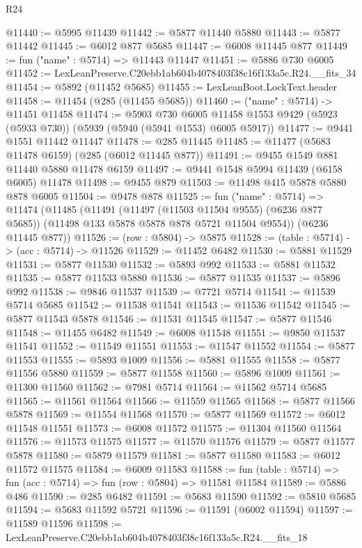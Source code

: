 \begin{lexlean}{R24}
\begin{coremodule}
@11440 := @5995 @11439
@11442 := @5877 @11440 @5880
@11443 := @5877 @11442
@11445 := @6012 @877 @5685
@11447 := @6008 @11445 @877
@11449 := fun ("name" : @5714) => @11443 @11447
@11451 := @5886 @730 @6005
@11452 := LexLeanPreserve.C20ebb1ab604b4078403f38c16f133a5c.R24.__fits_34
@11454 := @5892 (@11452 @5685)
@11455 := LexLeanBoot.LockText.header
@11458 := @11454 (@285 (@11455 @5685))
@11460 := ("name" : @5714) -> @11451 @11458
@11474 := @5903
    @730
    @6005
    @11458
    @1553
    @9429
    (@5923 (@5933 @730))
    (@5939 (@5940 (@5941 @1553) @6005 @5917))
@11477 := @9441 @1551 @11442 @11447
@11478 := @285 @11445
@11485 := @11477 (@5683 @11478 @6159) (@285 (@6012 @11445 @877))
@11491 := @9455 @1549 @881 @11440 @5880 @11478 @6159
@11497 := @9441 @1548 @5994 @11439 (@6158 @6005) @11478
@11498 := @9455 @879
@11503 := @11498 @415 @5878 @5880 @878 @6005
@11504 := @9478 @878
@11525 := fun ("name" : @5714) =>
  @11474
    (@11485
      (@11491
        (@11497 (@11503 @11504 @9555) (@6236 @877 @5685))
        (@11498 @133 @5878 @5878 @878 @5721 @11504 @9554))
      (@6236 @11445 @877))
@11526 := (row : @5804) -> @5875
@11528 := (table : @5714) -> (acc : @5714) -> @11526
@11529 := @11452 @6482
@11530 := @5881 @11529
@11531 := @5877 @11530
@11532 := @5893 @992
@11533 := @5881 @11532
@11535 := @5877 @11533 @5880
@11536 := @5877 @11535
@11537 := @5896 @992
@11538 := @9846 @11537
@11539 := @7721 @5714
@11541 := @11539 @5714 @5685
@11542 := @11538 @11541
@11543 := @11536 @11542
@11545 := @5877 @11543 @5878
@11546 := @11531 @11545
@11547 := @5877 @11546
@11548 := @11455 @6482
@11549 := @6008 @11548
@11551 := @9850 @11537 @11541
@11552 := @11549 @11551
@11553 := @11547 @11552
@11554 := @5877 @11553
@11555 := @5893 @1009
@11556 := @5881 @11555
@11558 := @5877 @11556 @5880
@11559 := @5877 @11558
@11560 := @5896 @1009
@11561 := @11300 @11560
@11562 := @7981 @5714
@11564 := @11562 @5714 @5685
@11565 := @11561 @11564
@11566 := @11559 @11565
@11568 := @5877 @11566 @5878
@11569 := @11554 @11568
@11570 := @5877 @11569
@11572 := @6012 @11548 @11551
@11573 := @6008 @11572
@11575 := @11304 @11560 @11564
@11576 := @11573 @11575
@11577 := @11570 @11576
@11579 := @5877 @11577 @5878
@11580 := @5879 @11579
@11581 := @5877 @11580
@11583 := @6012 @11572 @11575
@11584 := @6009 @11583
@11588 := fun (table : @5714) => fun (acc : @5714) => fun (row : @5804) => @11581 @11584
@11589 := @5886 @486
@11590 := @285 @6482
@11591 := @5683 @11590
@11592 := @5810 @5685
@11594 := @5683 @11592 @5721
@11596 := @11591 (@6002 @11594)
@11597 := @11589 @11596
@11598 := LexLeanPreserve.C20ebb1ab604b4078403f38c16f133a5c.R24.__fits_18

\end{coremodule}
\end{lexlean}
